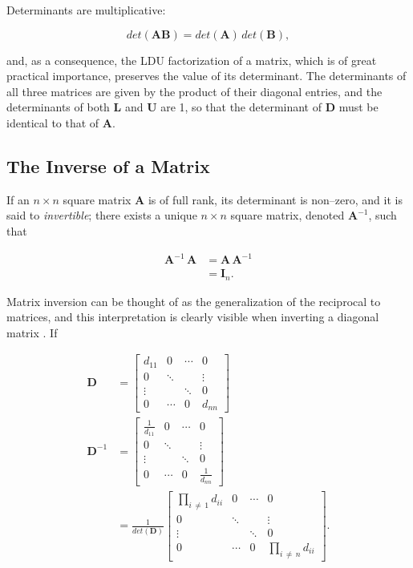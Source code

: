 \documentclass[graybox,envcountchap,sectrefs]{svmono}\usepackage[]{graphicx}\usepackage[]{xcolor}
\begin{document}
\begin{appendices}
Determinants are multiplicative:

\begin{equation}
det\left(\mathbf{A}\mathbf{B}\right)=det\left(\mathrm{\mathbf{A}}\right)\,det\left(\mathrm{\mathbf{B}}\right),\label{eq:DeterminantOfProducts}
\end{equation}

and, as a consequence, the LDU factorization of a matrix, which is
of great practical importance, preserves the value of its determinant.
The determinants of all three matrices are given by the product of
their diagonal entries, and the determinants of both $\mathrm{\mathbf{L}}$
and $\mathrm{\mathbf{U}}$ are 1, so that the determinant of $\mathrm{\mathbf{D}}$
must be identical to that of $\mathrm{\mathbf{A}}$.

\subsection{The Inverse of a Matrix}

If an $n\times n$ square matrix $\mathbf{A}$ is of full rank, its
determinant is non--zero, and it is said to \emph{invertible}; there
exists a unique $n\times n$ square matrix, denoted $\mathbf{A}^{-1}$,
such that

\begin{align}
\mathbf{A}^{-1}\,\mathbf{A} & =\mathbf{A}\,\mathbf{A}^{-1}\nonumber \\
 & =\mathbf{I}_{n}.\label{eq:AinverseAeqI}
\end{align}

Matrix inversion can be thought of as the generalization of the reciprocal
to matrices, and this interpretation is clearly visible when inverting
a diagonal matrix . If

\begin{align}
\mathrm{\mathbf{D}} & =\left[\begin{array}{cccc}
d_{11} & 0 & \cdots & 0\\
0 & \ddots &  & \vdots\\
\vdots &  & \ddots & 0\\
0 & \cdots & 0 & d_{nn}
\end{array}\right]\nonumber \\[0.5em]
\mathrm{\mathbf{D}}^{-1} & =\left[\begin{array}{cccc}
\frac{1}{d_{11}} & 0 & \cdots & 0\\
0 & \ddots &  & \vdots\\
\vdots &  & \ddots & 0\\
0 & \cdots & 0 & \frac{1}{d_{nn}}
\end{array}\right]\nonumber \\
 & =\frac{1}{det\left(\mathrm{\mathbf{D}}\right)}\left[\begin{array}{cccc}
\prod_{i\,\ne\,1}d_{ii} & 0 & \cdots & 0\\
0 & \ddots &  & \vdots\\
\vdots &  & \ddots & 0\\
0 & \cdots & 0 & \prod_{i\,\ne\,n}d_{ii}
\end{array}\right].\label{eq:Dinverse}
\end{align}


\end{appendices}
\end{document}
